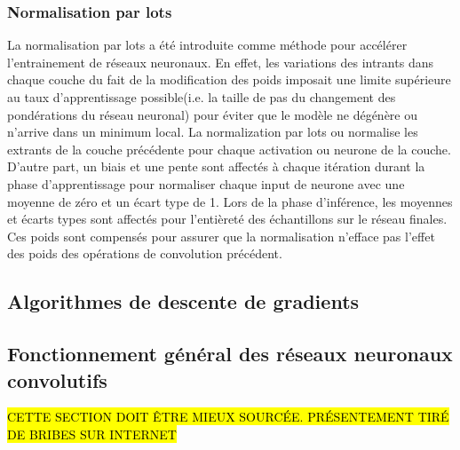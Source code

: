     \subsubsection{Normalisation par lots}
    La normalisation par lots \parencite{ioffe_batch_2015} a été introduite comme méthode pour accélérer l'entrainement de réseaux neuronaux. En effet, les variations des intrants dans chaque couche du fait de la modification des poids imposait une limite supérieure au taux d'apprentissage possible(i.e. la taille de pas du changement des pondérations du réseau neuronal) pour éviter que le modèle ne dégénère ou n'arrive dans un minimum local. La normalization par lots ou  \fg{} normalise les extrants de la couche précédente pour chaque activation ou neurone de la couche. D'autre part, un biais et une pente sont affectés à chaque itération durant la phase d'apprentissage pour normaliser chaque input de neurone avec une moyenne de zéro et un écart type de 1. Lors de la phase d'inférence, les moyennes et écarts types sont affectés pour l'entièreté des échantillons sur le réseau finales. Ces poids sont compensés pour assurer que la normalisation n'efface pas l'effet des poids des opérations de convolution précédent. 
    \subsection{Algorithmes de descente de gradients} \label{ssec:grad_desc}

    \subsection{Fonctionnement général des réseaux neuronaux convolutifs}
    \hl{CETTE SECTION DOIT ÊTRE MIEUX SOURCÉE. PRÉSENTEMENT TIRÉ DE BRIBES SUR INTERNET}\par

